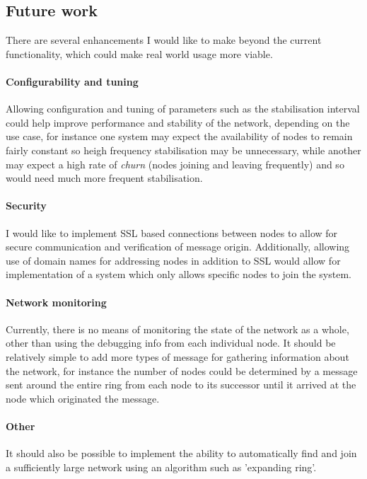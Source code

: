 \documentclass{article}
\begin{document}
\subsection{Future work}

There are several enhancements I would like to make beyond the current functionality, which could make real world usage more viable.
\paragraph{Configurability and tuning} Allowing configuration and tuning of parameters such as the stabilisation interval could help improve performance and stability of the network, depending on the use case, for instance one system may expect the availability of nodes to remain fairly constant so heigh frequency stabilisation may be unnecessary, while another may expect a high rate of \textit{churn} (nodes joining and leaving frequently) and so would need much more frequent stabilisation.

\paragraph{Security} I would like to implement SSL based connections between nodes to allow for secure communication and verification of message origin.
Additionally, allowing use of domain names for addressing nodes in addition to SSL would allow for implementation of a system which only allows specific nodes to join the system.

\paragraph{Network monitoring} Currently, there is no means of monitoring the state of the network as a whole, other than using the debugging info from each individual node. It should be relatively simple to add more types of message for gathering information about the network, for instance the number of nodes could be determined by a message sent around the entire ring from each node to its successor until it arrived at the node which originated the message.


\paragraph{Other} It should also be possible to implement the ability to automatically find and join a sufficiently large network using an algorithm such as 'expanding ring'.
\end{document}
